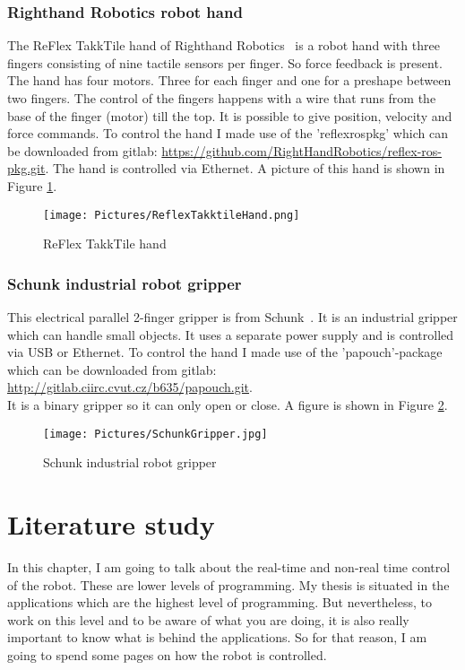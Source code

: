 \documentclass[11pt,a4paper]{report}
\begin{document}
\subsection{Righthand Robotics robot hand}\label{Robothand}
The ReFlex TakkTile hand of Righthand Robotics~\cite{RighthandRobotics} is a robot hand with three fingers consisting of nine tactile sensors per finger. So force feedback is present. The hand has four motors. Three for each finger and one for a preshape between two fingers. The control of the fingers happens with a wire that runs from the base of the finger (motor) till the top. It is possible to give position, velocity and force commands. To control the hand I made use of the 'reflex\textunderscore ros\textunderscore pkg' which can be downloaded from gitlab:
\url{https://github.com/RightHandRobotics/reflex-ros-pkg.git}.
The hand is controlled via Ethernet. A picture of this hand is shown in Figure \ref{fig:ReflexTakktileHand}.
\begin{figure}[!ht]
	\centering
	\texttt{[image: Pictures/ReflexTakktileHand.png]}
	\caption{ReFlex TakkTile hand}
	\label{fig:ReflexTakktileHand}
\end{figure}

\subsection{Schunk industrial robot gripper}\label{Schunk}
This electrical parallel 2-finger gripper is from Schunk~\cite{SchunkGripper}. It is an industrial gripper which can handle small objects. It uses a separate power supply and is controlled via USB or Ethernet. To control the hand I made use of the 'papouch'-package which can be downloaded from gitlab:
\url{http://gitlab.ciirc.cvut.cz/b635/papouch.git}.\\
It is a binary gripper so it can only open or close. A figure is shown in Figure \ref{fig:SchunkGripper}.
\begin{figure}[!ht]
	\centering
	\texttt{[image: Pictures/SchunkGripper.jpg]}
	\caption{Schunk industrial robot gripper}
	\label{fig:SchunkGripper}
\end{figure}

\chapter{Literature study}
In this chapter, I am going to talk about the real-time and non-real time control of the robot. These are lower levels of programming. My thesis is situated in the applications which are the highest level of programming. But nevertheless, to work on this level and to be aware of what you are doing, it is also really important to know what is behind the applications. So for that reason, I am going to spend some pages on how the robot is controlled.
\end{document}
